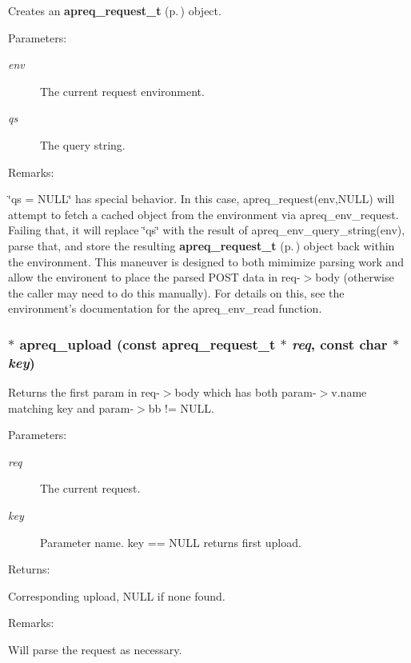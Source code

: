 Creates an {\bf apreq\_\-request\_\-t} {\rm (p.\,\pageref{structapreq__request__t})} object. \begin{Desc}
\item[Parameters: ]\par
\begin{description}
\item[{\em 
env}]The current request environment. \item[{\em 
qs}]The query string. \end{description}
\end{Desc}
\begin{Desc}
\item[Remarks: ]\par
\char`\"{}qs = NULL\char`\"{} has special behavior. In this case, apreq\_\-request(env,NULL) will attempt to fetch a cached object from the environment via apreq\_\-env\_\-request. Failing that, it will replace \char`\"{}qs\char`\"{} with the result of apreq\_\-env\_\-query\_\-string(env),  parse that, and store the resulting {\bf apreq\_\-request\_\-t} {\rm (p.\,\pageref{structapreq__request__t})} object back  within the environment. This maneuver is designed to both mimimize parsing work and allow the environent to place the parsed POST data in req-$>$body (otherwise the caller may need to do this manually). For details on this, see the environment's documentation for the apreq\_\-env\_\-read function. \end{Desc}
\subsubsection{$\ast$ apreq\_\-upload (const {\bf apreq\_\-request\_\-t} $\ast$ {\em req}, const char $\ast$ {\em key})}\label{group__params_a15}


Returns the first param in req-$>$body which has both param-$>$v.name  matching key and param-$>$bb != NULL. \begin{Desc}
\item[Parameters: ]\par
\begin{description}
\item[{\em 
req}]The current request. \item[{\em 
key}]Parameter name. key == NULL returns first upload. \end{description}
\end{Desc}
\begin{Desc}
\item[Returns: ]\par
Corresponding upload, NULL if none found. \end{Desc}
\begin{Desc}
\item[Remarks: ]\par
Will parse the request as necessary. \end{Desc}
